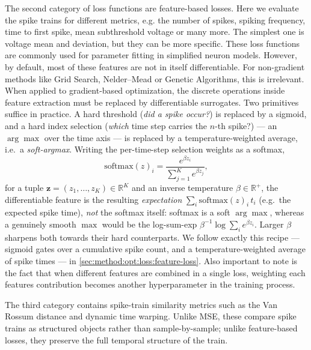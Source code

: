 The second category of loss functions are feature-based losses.
Here we evaluate the spike trains for different metrics, e.g. the number of spikes, spiking frequency, time to first spike, mean subthreshold voltage or many more.
The simplest one is voltage mean and deviation, but they can be more specific.
These loss functions are commonly used for parameter fitting in simplified neuron models.
However, by default, most of these features are not in itself differentiable.
For non-gradient methods like Grid Search, Nelder--Mead or Genetic Algorithms, this is irrelevant.
When applied to gradient-based optimization, the discrete operations inside feature extraction must be replaced by differentiable surrogates.
Two primitives suffice in practice.
A hard threshold (\emph{did a spike occur?}) is replaced by a sigmoid, and a hard index selection (\emph{which} time step carries the $n$-th spike?) --- an $\arg\max$ over the time axis --- is replaced by a temperature-weighted average, i.e.\ a \emph{soft-argmax}.
Writing the per-time-step selection weights as a softmax,
\begin{equation}\label{eq:softmax}
  \mathrm{softmax}(z)_i = \frac{e^{\beta z_i}}{\sum_{j=1}^{K} e^{\beta z_j}},
\end{equation}
for a tuple $\mathbf{z} = (z_1, \dots, z_K) \in \mathbb{R}^K$ and an inverse temperature $\beta \in \mathbb{R}^+$,
the differentiable feature is the resulting \emph{expectation} $\sum_i \mathrm{softmax}(z)_i\,t_i$ (e.g.\ the expected spike time), \emph{not} the softmax itself:
softmax is a soft $\arg\max$, whereas a genuinely smooth $\max$ would be the log-sum-exp $\beta^{-1}\log\sum_i e^{\beta z_i}$.
Larger $\beta$ sharpens both towards their hard counterparts.
We follow exactly this recipe --- sigmoid gates over a cumulative spike count, and a temperature-weighted average of spike times --- in \cref{sec:method:opt:loss:feature-loss}.
Also important to note is the fact that when different features are combined in a single loss, weighting each features contribution becomes another hyperparameter in the training process.

The third category contains spike-train similarity metrics such as the Van Rossum distance and dynamic time warping.
Unlike MSE, these compare spike trains as structured objects rather than sample-by-sample;
unlike feature-based losses, they preserve the full temporal structure of the train.

